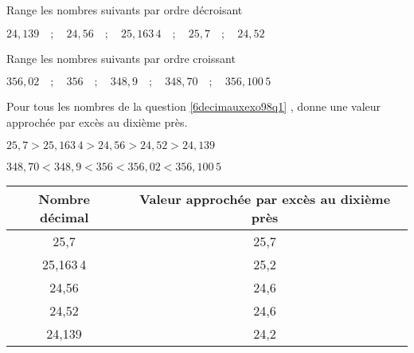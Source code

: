 \begin{myenumerate}
\item\label{6decimauxexo98q1} Range les nombres suivants par ordre décroisant
\par\centerline{$24,139\quad;\quad24,56\quad;\quad25,163\,4
\quad;\quad25,7\quad;\quad24,52$}
\item Range les nombres suivants par ordre croissant
\par\centerline{$356,02\quad;\quad356\quad;\quad348,9
\quad;\quad348,70\quad;\quad356,100\,5$}
\item Pour tous les nombres de la question \ref{6decimauxexo98q1}
, donne une valeur approchée par excès au dixième près.
\end{myenumerate}
\begin{myenumerate}
  \item $25,7>25,163\,4>24,56>24,52>24,139$
  \item $348,70<348,9<356<356,02<356,100\,5$
  \item\hfill\newline
    \begin{tabular}{|c|c|}
      \hline
      Nombre décimal&Valeur approchée par excès au dixième près\\
      \hline
      25,7&25,7\\
      \hline
      25,163\,4&25,2\\
      \hline
      24,56&24,6\\
      \hline
      24,52&24,6\\
      \hline
      24,139&24,2\\
      \hline
    \end{tabular}
\end{myenumerate}
